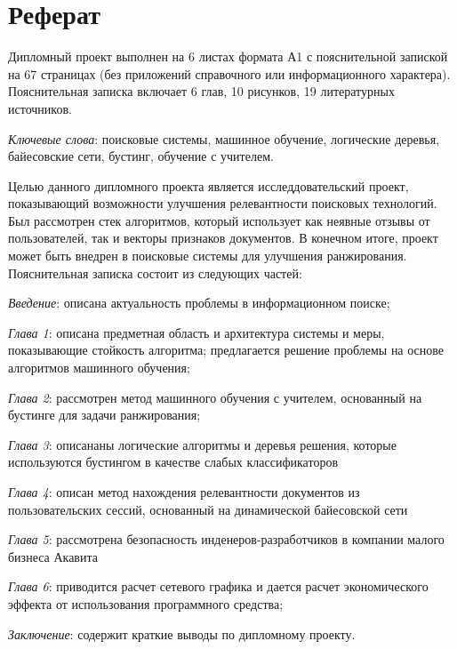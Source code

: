 \section*{Реферат}
\thispagestyle{empty}

Дипломный проект выполнен на 6 листах формата А1 с пояснительной запиской на 67 страницах (без приложений справочного или информационного характера). Пояснительная записка включает 6 глав, 10 рисунков, 19 литературных источников.

\emph{Ключевые слова}: поисковые системы, машинное обучение, логические деревья, байесовские сети, бустинг, обучение с учителем.


Целью данного дипломного проекта является исследдовательский проект, показывающий возможности улучшения релевантности поисковых технологий. Был рассмотрен стек алгоритмов, который использует как неявные отзывы от пользователей, так и векторы признаков документов. В конечном итоге, проект может быть внедрен в поисковые системы для улучшения ранжирования. Пояснительная записка состоит из следующих частей:

\emph{Введение}: описана актуальность проблемы в информационном поиске;

\emph{Глава 1}: описана предметная область и архитектура системы и меры, показывающие стойкость алгоритма; предлагается решение проблемы на основе алгоритмов машинного обучения;

\emph{Глава 2}: рассмотрен метод машинного обучения с учителем, основанный на бустинге для задачи ранжирования;

\emph{Глава 3}: описананы логические алгоритмы и деревья решения, которые используются бустингом в качестве слабых классификаторов

\emph{Глава 4}: описан метод нахождения релевантности документов из пользовательских сессий, основанный на динамической байесовской сети

\emph{Глава 5}: рассмотрена безопасность инденеров-разработчиков в компании малого бизнеса Акавита

\emph{Глава 6}: приводится расчет сетевого графика и дается расчет экономического эффекта от использования программного средства;

\emph{Заключение}: содержит краткие выводы по дипломному проекту.

\newpage

